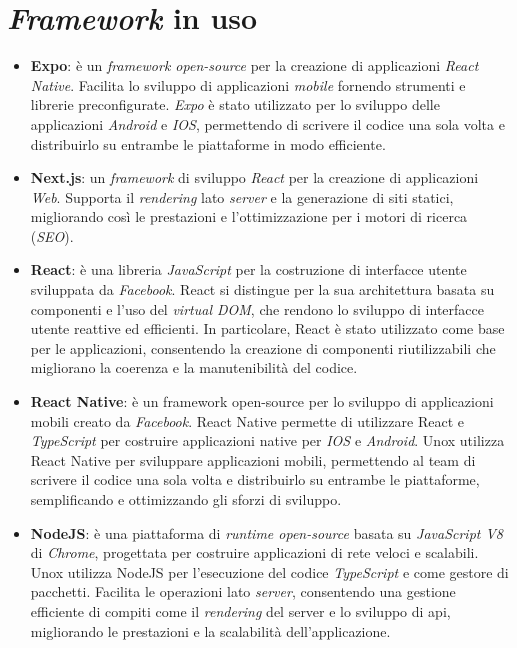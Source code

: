 \section{\textit{Framework} in uso}
\begin{itemize}
    \item \textbf{Expo}: è un \textit{framework open-source} per la creazione di applicazioni \textit{React Native}.
    Facilita lo sviluppo di applicazioni \textit{mobile} fornendo strumenti e librerie preconfigurate.
    \textit{Expo} è stato utilizzato per lo sviluppo delle applicazioni \textit{Android} e \textit{IOS}, permettendo di scrivere il codice una sola volta e distribuirlo su entrambe le piattaforme in modo efficiente.
    \item \textbf{Next.js}: un \textit{framework} di sviluppo \textit{React} per la creazione di applicazioni \textit{Web}.
    Supporta il \textit{rendering} lato \textit{server} e la generazione di siti statici, migliorando così le prestazioni e l'ottimizzazione per i motori di ricerca (\textit{SEO}).
    \item \textbf{React}: è una libreria \textit{JavaScript} per la costruzione di interfacce utente sviluppata da \textit{Facebook}. React si distingue per la sua architettura basata su componenti e l'uso del \textit{virtual DOM}, che rendono lo sviluppo di interfacce utente reattive ed efficienti. In particolare, React è stato utilizzato come base per le applicazioni, consentendo la creazione di componenti riutilizzabili che migliorano la coerenza e la manutenibilità del codice.
    \item \textbf{React Native}: è un framework open-source per lo sviluppo di applicazioni mobili creato da \textit{Facebook}. React Native permette di utilizzare React e \textit{TypeScript} per costruire applicazioni native per \textit{IOS} e \textit{Android}. Unox utilizza React Native per sviluppare applicazioni mobili, permettendo al team di scrivere il codice una sola volta e distribuirlo su entrambe le piattaforme, semplificando e ottimizzando gli sforzi di sviluppo.
    \item \textbf{NodeJS}: è una piattaforma di \textit{runtime open-source} basata su \textit{JavaScript V8} di \textit{Chrome}, progettata per costruire applicazioni di rete veloci e scalabili. Unox utilizza NodeJS per l'esecuzione del codice \textit{TypeScript} e come gestore di pacchetti. Facilita le operazioni lato \textit{server}, consentendo una gestione efficiente di compiti come il \textit{rendering} del server e lo sviluppo di \gls{api}\glox, migliorando le prestazioni e la scalabilità dell'applicazione.
\end{itemize}

